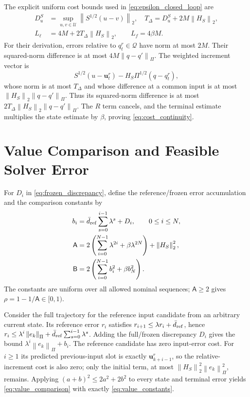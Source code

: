 \documentclass[journal]{IEEEtran}
\newcommand{\vu}{\mathbf{u}}
\newcommand{\norm}[1]{\left\lVert #1\right\rVert}
\begin{document}
The explicit uniform cost bounds used in \eqref{eq:epsilon_closed_loop} are
\begin{equation}
\begin{split}
D_u^S&=\sup_{u,v\in\mathcal U}\norm{S^{1/2}(u-v)}_2,\quad
T_\Delta=D_u^S+2M\norm{H_S}_2,\\
L_\ell&=4M+2T_\Delta\norm{H_S}_2,\qquad L_f=4\beta M.
\end{split}
\label{eq:cost_continuity}
\end{equation}
For their derivation, errors relative to $q_t^r\in\mathcal Q$ have norm at most $2M$. Their squared-norm difference is at most $4M\norm{q-q'}_\Pi$. The weighted increment vector is
\begin{equation*}
S^{1/2}(u-\vu_t^r)-H_S\Pi^{1/2}(q-q_t^r),
\end{equation*}
whose norm is at most $T_\Delta$ and whose difference at a common input is at most $\norm{H_S}_2\norm{q-q'}_\Pi$. Thus its squared-norm difference is at most $2T_\Delta\norm{H_S}_2\norm{q-q'}_\Pi$. The $R$ term cancels, and the terminal estimate multiplies the state estimate by $\beta$, proving \eqref{eq:cost_continuity}.

\section{Value Comparison and Feasible Solver Error}
\label{app:comparison}
For $D_i$ in \eqref{eq:frozen_discrepancy}, define the reference/frozen error accumulation and the comparison constants by
\begin{equation}
\begin{split}
b_i&=\bar d_{\rm ref}\sum_{s=0}^{i-1}\lambda^s+D_i,\qquad 0\le i\le N,\\
\mathsf A&=2\left(\sum_{i=0}^{N-1}\lambda^{2i}+\beta\lambda^{2N}\right)
+\norm{H_S}_2^2,\\
\mathsf B&=2\left(\sum_{i=0}^{N-1}b_i^2+\beta b_N^2\right).
\end{split}
\label{eq:value_constants}
\end{equation}
The constants are uniform over all allowed nominal sequences; $\mathsf A\ge2$ gives $\rho=1-1/\mathsf A\in[0,1)$.

Consider the full trajectory for the reference input candidate from an arbitrary current state. Its reference error $r_i$ satisfies $r_{i+1}\le\lambda r_i+\bar d_{\rm ref}$, hence $r_i\le\lambda^i\norm{e_k}_\Pi+\bar d_{\rm ref}\sum_{s=0}^{i-1}\lambda^s$. Adding the full/frozen discrepancy $D_i$ gives the bound $\lambda^i\norm{e_k}_\Pi+b_i$. The reference candidate has zero input-error cost. For $i\ge1$ its predicted previous-input slot is exactly $\vu_{k+i-1}^r$, so the relative-increment cost is also zero; only the initial term, at most $\norm{H_S}_2^2\norm{e_k}_\Pi^2$, remains. Applying $(a+b)^2\le2a^2+2b^2$ to every state and terminal error yields \eqref{eq:value_comparison} with exactly \eqref{eq:value_constants}.
\end{document}
